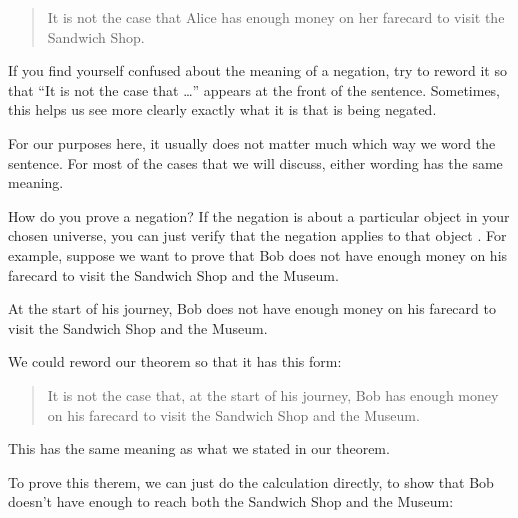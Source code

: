 \documentclass[../../../main.tex]{subfiles}
\begin{document}
\begin{quote}
  It is not the case that Alice has enough money on her farecard to visit the Sandwich Shop.
\end{quote}

\begin{aside}
  \begin{remark}
    If you find yourself confused about the meaning of a negation, try to reword it so that ``It is not the case that \ldots'' appears at the front of the sentence. Sometimes, this helps us see more clearly exactly what it is that is being negated.
  \end{remark}
\end{aside}
    
For our purposes here, it usually does not matter much which way we word the sentence. For most of the cases that we will discuss, either wording has the same meaning.

How do you prove a negation? If the negation is about a particular object in your chosen universe, you can just verify that the negation applies to that object . For example, suppose we want to prove that Bob does not have enough money on his farecard to visit the Sandwich Shop and the Museum.

\begin{framed}
  \begin{theorem}
    At the start of his journey, Bob does not have enough money on his farecard to visit the Sandwich Shop and the Museum.
  \end{theorem}
\end{framed}

\begin{aside}
  \begin{remark}
    We could reword our theorem so that it has this form:
    
    \begin{quote}
      It is not the case that, at the start of his journey, Bob has enough money on his farecard to visit the Sandwich Shop and the Museum.
    \end{quote}
    
    \noindent
    This has the same meaning as what we stated in our theorem.
  \end{remark}
\end{aside}

To prove this therem, we can just do the calculation directly, to show that Bob doesn't have enough to reach both the Sandwich Shop and the Museum:
\end{document}
